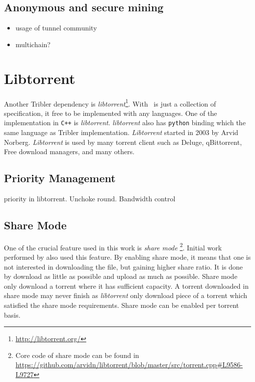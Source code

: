 \subsection{Anonymous and secure mining}
\begin{itemize}
\item  usage of tunnel community
\item  multichain?
\end{itemize}

\section{Libtorrent}
Another Tribler dependency is \textit{libtorrent}\footnote{\url{http://libtorrent.org/}}. With \bt~is just a collection of specification, it free to be implemented with any languages. One of the implementation in \texttt{C++} is \textit{libtorrent}. \textit{libtorrent} also has \texttt{python} binding which the same language as Tribler implementation. \textit{Libtorrent} started in 2003 by Arvid Norberg. \textit{Libtorrent} is used by many torrent client such as Deluge, qBittorrent, Free download managers, and many others.

\subsection{Priority Management}
priority in libtorrent. Unchoke round. Bandwidth control

\subsection{Share Mode}
One of the crucial feature used in this work is \textit{share mode} \footnote{Core code of share mode can be found in \url{https://github.com/arvidn/libtorrent/blob/master/src/torrent.cpp\#L9586-L9727}}. Initial work performed by \citeauthor{2015:creditmining:capota} also used this feature\cite{2015:creditmining:capota}. By enabling share mode, it means that one is not interested in downloading the file, but gaining higher share ratio. It is done by download as little as possible and upload as much as possible. Share mode only download a torrent where it has sufficient capacity. A torrent downloaded in share mode may never finish as \textit{libtorrent} only download piece of a torrent which satisfied the share mode requirements. Share mode can be enabled per torrent basis.

